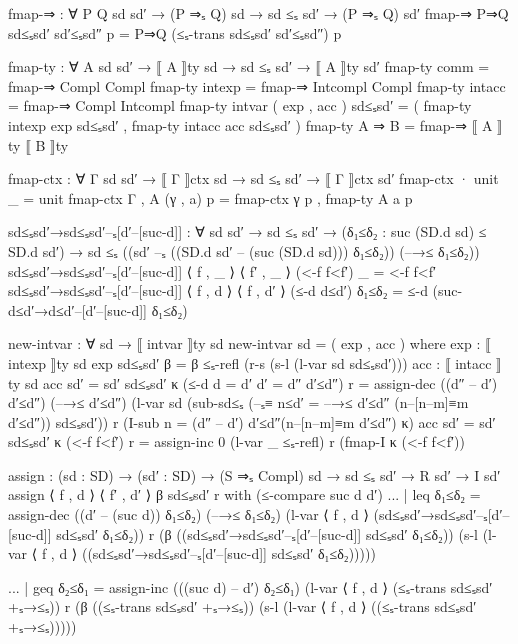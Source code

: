 \documentclass{article}
\begin{document}
\begin{prev}
\begin{code}
fmap-⇒ : ∀ {P Q sd sd′} → (P ⇒ₛ Q) sd → sd ≤ₛ sd′ → (P ⇒ₛ Q) sd′
fmap-⇒ P⇒Q sd≤ₛsd′ sd′≤ₛsd″ p = P⇒Q (≤ₛ-trans sd≤ₛsd′ sd′≤ₛsd″) p

fmap-ty : ∀ {A sd sd′} → ⟦ A ⟧ty sd → sd ≤ₛ sd′ → ⟦ A ⟧ty sd′
fmap-ty {comm}  = fmap-⇒ {Compl} {Compl}
fmap-ty {intexp} = fmap-⇒ {Intcompl} {Compl}
fmap-ty {intacc} = fmap-⇒ {Compl} {Intcompl}
fmap-ty {intvar} ( exp , acc ) sd≤ₛsd′ = 
    ( fmap-ty {intexp} exp sd≤ₛsd′ , fmap-ty {intacc} acc sd≤ₛsd′ )
fmap-ty {A ⇒ B} = fmap-⇒ {⟦ A ⟧ty} {⟦ B ⟧ty}

fmap-ctx : ∀ {Γ sd sd′} → ⟦ Γ ⟧ctx sd → sd ≤ₛ sd′ → ⟦ Γ ⟧ctx sd′
fmap-ctx {·} unit _ = unit
fmap-ctx {Γ , A} (γ , a) p = fmap-ctx γ p , fmap-ty {A} a p


sd≤ₛsd′→sd≤ₛsd′–ₛ[d′–[suc-d]] : ∀ {sd sd′} → sd ≤ₛ sd′ 
    → (δ₁≤δ₂ : suc (SD.d sd) ≤ SD.d sd′) 
    → sd ≤ₛ ((sd′ –ₛ ((SD.d sd′ – (suc (SD.d sd))) δ₁≤δ₂)) (–→≤ δ₁≤δ₂))
sd≤ₛsd′→sd≤ₛsd′–ₛ[d′–[suc-d]] {⟨ f , _ ⟩} {⟨ f′ , _ ⟩} (<-f f<f′) _ 
    = <-f f<f′
sd≤ₛsd′→sd≤ₛsd′–ₛ[d′–[suc-d]] {⟨ f , d ⟩} {⟨ f , d′ ⟩} (≤-d d≤d′) δ₁≤δ₂ 
    = ≤-d (suc-d≤d′→d≤d′–[d′–[suc-d]] δ₁≤δ₂)

new-intvar : ∀ sd → ⟦ intvar ⟧ty sd
new-intvar sd = ( exp , acc )
    where
        exp : ⟦ intexp ⟧ty sd
        exp sd≤ₛsd′ β = β ≤ₛ-refl (r-s (s-l (l-var sd sd≤ₛsd′)))
        acc : ⟦ intacc ⟧ty sd
        acc {sd′ = sd′} sd≤ₛsd′ κ (≤-d {d = d′} {d′ = d″} d′≤d″) r
            = assign-dec 
                ((d″ – d′) d′≤d″) (–→≤ d′≤d″) 
                (l-var sd
                   (sub-sd≤ₛ 
                        (–ₛ≡ {n≤d′ = –→≤ d′≤d″} (n–[n–m]≡m d′≤d″)) 
                        sd≤ₛsd′))
                r
                (I-sub {n = (d″ – d′) d′≤d″}(n–[n–m]≡m d′≤d″) κ)
        acc {sd′ = sd′} sd≤ₛsd′ κ (<-f f<f′) r 
            = assign-inc 0 (l-var _ ≤ₛ-refl) r (fmap-I κ (<-f f<f′))


assign : (sd : SD) → (sd′ : SD) → (S ⇒ₛ Compl) sd 
            → sd ≤ₛ sd′ → R sd′ → I sd′
assign ⟨ f , d ⟩ ⟨ f′ , d′ ⟩ β sd≤ₛsd′ r with (≤-compare {suc d} {d′})
... | leq δ₁≤δ₂ 
        = assign-dec 
            ((d′ – (suc d)) δ₁≤δ₂) (–→≤ δ₁≤δ₂) 
              (l-var ⟨ f , d ⟩ 
                (sd≤ₛsd′→sd≤ₛsd′–ₛ[d′–[suc-d]] sd≤ₛsd′ δ₁≤δ₂)) 
              r 
              (β ((sd≤ₛsd′→sd≤ₛsd′–ₛ[d′–[suc-d]] sd≤ₛsd′ δ₁≤δ₂)) 
                (s-l (l-var ⟨ f , d ⟩ 
                  ((sd≤ₛsd′→sd≤ₛsd′–ₛ[d′–[suc-d]] sd≤ₛsd′ δ₁≤δ₂)))))


... | geq δ₂≤δ₁ = assign-inc (((suc d) – d′) δ₂≤δ₁) 
                  (l-var ⟨ f , d ⟩ (≤ₛ-trans sd≤ₛsd′ +ₛ→≤ₛ)) r 
                  (β ((≤ₛ-trans sd≤ₛsd′ +ₛ→≤ₛ)) 
                    (s-l (l-var ⟨ f , d ⟩ ((≤ₛ-trans sd≤ₛsd′ +ₛ→≤ₛ)))))


\end{code}
\end{prev}
\end{document}
